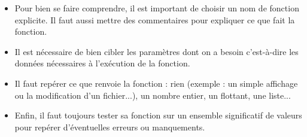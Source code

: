 
\begin{rem}

\begin{itemize}
	\item Pour bien se faire comprendre, il est important de choisir un nom de fonction 
explicite. 
Il faut aussi mettre des commentaires pour expliquer ce que fait la fonction.
	\item Il est nécessaire de bien cibler les paramètres dont on a besoin 
c'est-à-dire les données nécessaires à l'exécution de la fonction.
	\item Il faut repérer ce que renvoie la fonction : rien (exemple : un simple affichage ou 
la modification d'un fichier...), un nombre entier, 
un flottant, une liste...
%
%
%
%
%
%

	\item Enfin, il faut toujours tester sa fonction sur un ensemble significatif de valeurs 
pour repérer d'éventuelles erreurs ou manquements.
\end{itemize}
\end{rem} 

